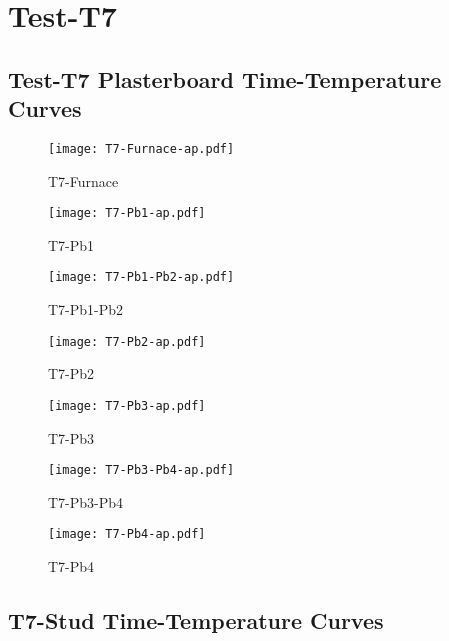 \pagebreak

\section*{Test-T7}
\subsection*{Test-T7 Plasterboard Time-Temperature Curves}

\begin{figure}[htbp]
\centering
	\texttt{[image: T7-Furnace-ap.pdf]}
	\caption*{T7-Furnace}
\end{figure}
\begin{figure}[htbp]
	\centering
		\texttt{[image: T7-Pb1-ap.pdf]}
		\caption*{T7-Pb1}
\end{figure}
\begin{figure}[htbp]
	\centering
		\texttt{[image: T7-Pb1-Pb2-ap.pdf]}
		\caption*{T7-Pb1-Pb2}
\end{figure}
\begin{figure}[htbp]
	\centering
		\texttt{[image: T7-Pb2-ap.pdf]}
		\caption*{T7-Pb2}
\end{figure}
\begin{figure}[htbp]
	\centering
		\texttt{[image: T7-Pb3-ap.pdf]}
		\caption*{T7-Pb3}
\end{figure}
\begin{figure}[htbp]
	\centering
			\texttt{[image: T7-Pb3-Pb4-ap.pdf]}
			\caption*{T7-Pb3-Pb4}
\end{figure}
\begin{figure}[htbp]
	\centering
			\texttt{[image: T7-Pb4-ap.pdf]}
			\caption*{T7-Pb4}
\end{figure}

\pagebreak

\subsection*{T7-Stud Time-Temperature Curves}

